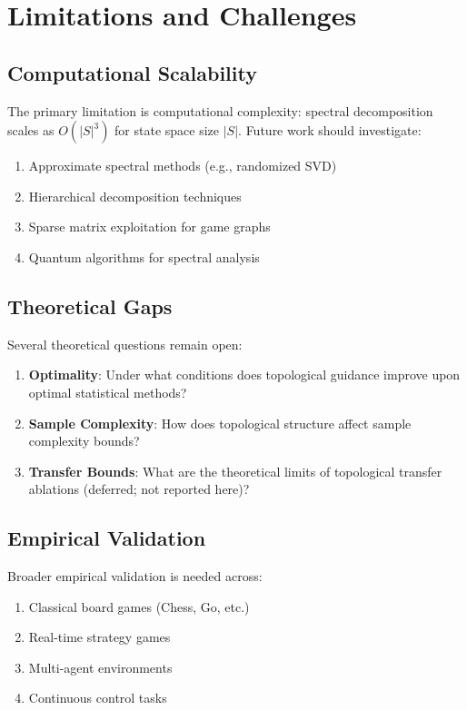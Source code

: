 \documentclass{article}
\begin{document}
\section{Limitations and Challenges}

\subsection{Computational Scalability}

The primary limitation is computational complexity: spectral decomposition scales as $O(|S|^3)$ for state space size $|S|$. Future work should investigate:

\begin{enumerate}
\item Approximate spectral methods (e.g., randomized SVD)
\item Hierarchical decomposition techniques
\item Sparse matrix exploitation for game graphs
\item Quantum algorithms for spectral analysis
\end{enumerate}

\subsection{Theoretical Gaps}

Several theoretical questions remain open:

\begin{enumerate}
\item \textbf{Optimality}: Under what conditions does topological guidance improve upon optimal statistical methods?
\item \textbf{Sample Complexity}: How does topological structure affect sample complexity bounds?
\item \textbf{Transfer Bounds}: What are the theoretical limits of topological transfer ablations (deferred; not reported here)?
\end{enumerate}

\subsection{Empirical Validation}

Broader empirical validation is needed across:
\begin{enumerate}
\item Classical board games (Chess, Go, etc.)
\item Real-time strategy games
\item Multi-agent environments  
\item Continuous control tasks
\end{enumerate}
\end{document}
